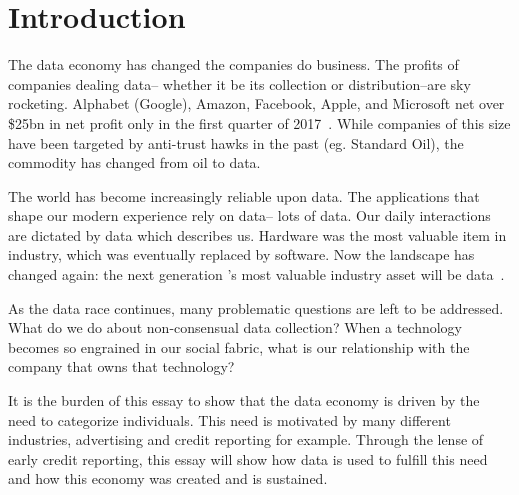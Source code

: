 \section{Introduction}

The data economy has changed the companies do business. The profits of
companies dealing data-- whether it be its collection or distribution--are sky
rocketing.  Alphabet (Google), Amazon, Facebook, Apple, and Microsoft net over
\$25bn in net profit only in the first quarter of 2017~\cite{economist2017}.
While companies of this size have been targeted by anti-trust hawks in the past
(eg. Standard Oil), the commodity has changed from oil to data.

The world has become increasingly reliable upon data. The applications that
shape our modern experience rely on data-- lots of data. Our daily interactions
are dictated by data which describes us. Hardware was the most valuable item in
industry, which was eventually replaced by software. Now the landscape has
changed again: the next generation 's most valuable industry asset will be
data~\cite{janeway2018doing}.

As the data race continues, many problematic questions are left to be
addressed.  What do we do about non-consensual data collection? When a
technology becomes so engrained in our social fabric, what is our relationship
with the company that owns that technology?


It is the burden of this essay to show that the data economy is driven by the need
to categorize individuals. This need is motivated by many different industries,
advertising and credit reporting for example. Through the lense of early credit reporting,
this essay will show how data is used to fulfill this need and how this economy
was created and is sustained.
